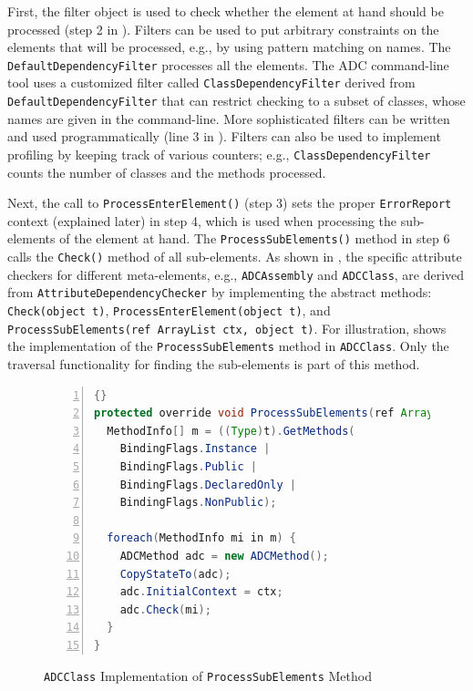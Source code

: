 First, the filter object is used to check whether the element at hand should be processed (step 2 in ). 
Filters can be used to put arbitrary constraints on the elements that will be processed, e.g., by using pattern matching on names. The \texttt{De\-fault\-De\-pen\-de\-ncyFi\-lter} processes all the elements. 
The ADC command-line tool uses a customized filter called \texttt{Class\-De\-pen\-de\-ncyFi\-lter} derived from \texttt{De\-faultDe\-pen\-de\-ncyFi\-lter} that can restrict checking to a subset of classes, whose names are given in the command-line. More sophisticated filters can be written and used programmatically (line 3 in ). Filters can also be used to implement profiling by keeping track of various counters; e.g., \texttt{Class\-De\-pen\-de\-ncyFi\-lter} counts the number of classes and the methods processed.

Next, the call to \texttt{Process\-Enter\-Element()} (step 3) sets the proper \texttt{Error\-Report} context (explained later) in step 4, which is used when processing the sub-elements of the element at hand. The \texttt{Process\-Sub\-Ele\-ments()} method in step 6 calls the \texttt{Check()} method of all sub-elements. As shown in , the specific attribute checkers for different meta-elements, e.g., \texttt{ADC\-Assembly} and \texttt{ADCClass}, are derived from \texttt{Attri\-bute\-Depe\-ndency\-Che\-cker} by implementing the abstract methods: \texttt{Check(object t)}, \texttt{Pro\-cess\-EnterEle\-ment(object t)}, and \texttt{Pro\-cess\-Sub\-Ele\-ments(ref Array\-List ctx,\- object t)}.
For illustration,  shows the implementation of the \texttt{Pro\-cess\-Sub\-Ele\-ments} method in \texttt{ADC\-Class}. Only the traversal functionality for finding the sub-elements is part of this method.

\begin{figure}[ht]
\begin{center}
\begin{minipage}{12cm}
	\begin{scriptsize}
\begin{lstlisting}[numbers=left,language=Java,frame=leftline]{}
protected override void ProcessSubElements(ref ArrayList ctx, object t) {
  MethodInfo[] m = ((Type)t).GetMethods(
    BindingFlags.Instance |
    BindingFlags.Public |
    BindingFlags.DeclaredOnly |
    BindingFlags.NonPublic);

  foreach(MethodInfo mi in m) {
    ADCMethod adc = new ADCMethod();
    CopyStateTo(adc);
    adc.InitialContext = ctx;
    adc.Check(mi);
  }
}
\end{lstlisting}
  \end{scriptsize}
\end{minipage}
\end{center}
  \caption{\texttt{ADCClass} Implementation of \texttt{ProcessSubElements} Method}
	\label{fig:proc-sub-impl}
 \end{figure}

